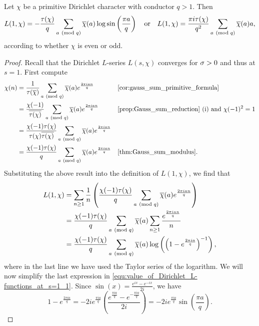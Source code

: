     \begin{theorem}\label{thm:Value_of_Dirichlet_L-functions_at_s=1}
      Let $\chi$ be a primitive Dirichlet character with conductor $q > 1$. Then
      \[
        L(1,\chi) = -\frac{\tau(\chi)}{q}\sum_{a \ \left(\text{mod }q\right)}\overline{\chi}(a)\log\sin\left(\frac{\pi a}{q}\right) \quad \text{or} \quad L(1,\chi) = \frac{\pi i\tau(\chi)}{q^{2}}\sum_{a \ \left(\text{mod }q\right)}\overline{\chi}(a)a,
      \]
      according to whether $\chi$ is even or odd.
    \end{theorem}
    \begin{proof}
      Recall that the Dirichlet $L$-series $L(s,\chi)$ converges for $\sigma > 0$ and thus at $s = 1$. First compute
      \begin{align*}
        \chi(n) &= \frac{1}{\tau(\cchi)}\sum_{a \tmod{q}}\cchi(a)e^{\frac{2\pi ian}{q}} && \text{\cref{cor:gauss_sum_primitive_formula}} \\
        &= \frac{\chi(-1)}{\conj{\tau(\chi)}}\sum_{a \tmod{q}}\cchi(a)e^{\frac{2\pi ian}{q}} && \text{\cref{prop:Gauss_sum_reduction} (i) and $\chi(-1)^{2} = 1$} \\
        &= \frac{\chi(-1)\tau(\chi)}{\tau(\chi)\conj{\tau(\chi)}}\sum_{a \tmod{q}}\cchi(a)e^{\frac{2\pi ian}{q}} \\
        &= \frac{\chi(-1)\tau(\chi)}{q}\sum_{a \tmod{q}}\cchi(a)e^{\frac{2\pi ian}{q}} && \text{\cref{thm:Gauss_sum_modulus}}.
      \end{align*}
      Substituting the above result into the definition of $L(1,\chi)$, we find that
      \begin{equation}\label{equ:value_of_Dirichlet_L-functions_at_s=1_1}
        \begin{aligned}
          L(1,\chi) &= \sum_{n \ge 1}\frac{1}{n}\left(\frac{\chi(-1)\tau(\chi)}{q}\sum_{a \ \left(\text{mod }q\right)}\overline{\chi}(a)e^{\frac{2\pi ian}{q}}\right) \\
          &= \frac{\chi(-1)\tau(\chi)}{q}\sum_{a \ \left(\text{mod }q\right)}\overline{\chi}(a)\sum_{n \ge 1}\frac{e^{\frac{2\pi ian}{q}}}{n} \\
          &= \frac{\chi(-1)\tau(\chi)}{q}\sum_{a \ \left(\text{mod }q\right)}\overline{\chi}(a)\log\left(\left(1-e^{\frac{2\pi ia}{q}}\right)^{-1}\right),
        \end{aligned}
      \end{equation}
      where in the last line we have used the Taylor series of the logarithm. We will now simplify the last expression in \cref{equ:value_of_Dirichlet_L-functions_at_s=1_1}. Since $\sin(x) = \frac{e^{ix}-e^{-ix}}{2i}$, we have
      \[
        1-e^{\frac{2\pi ia}{q}} = -2ie^{\frac{\pi ia}{q}}\left(\frac{e^{\frac{\pi ia}{q}}-e^{-\frac{\pi ia}{q}}}{2i}\right) = -2ie^{\frac{\pi ia}{q}}\sin\left(\frac{\pi a}{q}\right).
\]
\end{proof}
